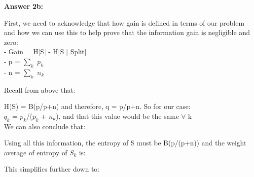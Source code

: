 \documentclass[10pt]{article}
\begin{document}
\begin{flushleft}

\textbf{Answer 2b:}

\hspace{1 cm}

First, we need to acknowledge that how gain is defined in terms of our problem and how we can use this to help prove that the information gain is negligible and zero: \\

- Gain = H[S] - H[S | Split] \\
- p = $\sum_{k}$ $p_k$ \\
- n = $\sum_{k}$ $n_k$ \\

\hspace{1 cm}

Recall from above that:

H(S) = B(p/p+n) and therefore, q = p/p+n. So for our case: \\
$q_k$ = $p_k$/($p_k$ + $n_k$), and that this value would be the same $\forall$ k\\
We can also conclude that: \\

\begin{center}
\end{center}


\hspace{1 cm}

Using all this information, the entropy of S must be B(p/(p+n)) and the weight average of entropy of $S_k$ is: \\

\begin{center}
\end{center}

\hspace{1 cm}

This simplifies further down to: \\

\begin{center}
\end{center}

\hspace{1 cm}

\begin{center}
\noindent{}
\end{center}

\end{flushleft}
\end{document}
